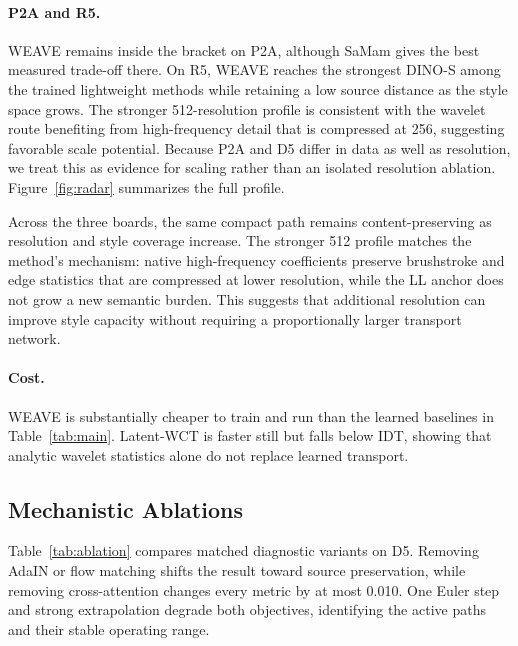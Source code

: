 \documentclass[letterpaper]{article}
\begin{document}
\paragraph{P2A and R5.}
WEAVE remains inside the bracket on P2A, although SaMam gives the best measured trade-off
there. On R5, WEAVE reaches the strongest DINO-S among the trained lightweight methods
while retaining a low source distance as the style space grows.
The stronger 512-resolution profile is consistent with the wavelet route benefiting from
high-frequency detail that is compressed at 256, suggesting favorable scale potential.
Because P2A and D5 differ in data as well as resolution, we treat this as evidence for
scaling rather than an isolated resolution ablation. Figure~\ref{fig:radar} summarizes the
full profile.

Across the three boards, the same compact path remains content-preserving as resolution and
style coverage increase. The stronger 512 profile matches the method's mechanism: native
high-frequency coefficients preserve brushstroke and edge statistics that are compressed at
lower resolution, while the LL anchor does not grow a new semantic burden. This suggests
that additional resolution can improve style capacity without requiring a proportionally
larger transport network.

\paragraph{Cost.}
WEAVE is substantially cheaper to train and run than the learned baselines in
Table~\ref{tab:main}. Latent-WCT is faster still but falls below IDT, showing that analytic
wavelet statistics alone do not replace learned transport.

\subsection{Mechanistic Ablations}
\label{sec:ablation}

Table~\ref{tab:ablation} compares matched diagnostic variants on D5. Removing AdaIN
or flow matching shifts the result toward source preservation, while removing cross-attention
changes every metric by at most 0.010. One Euler step and strong extrapolation degrade both
objectives, identifying the active paths and their stable operating range.
\end{document}
